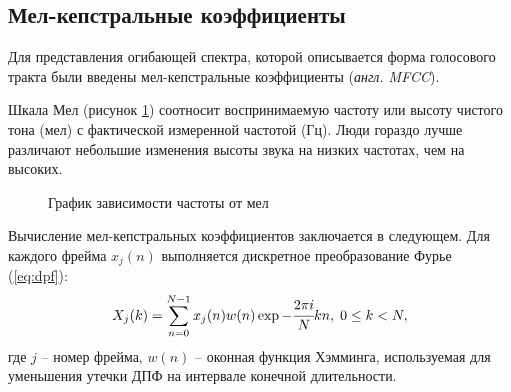 \subsection{Мел-кепстральные коэффициенты}
Для представления огибающей спектра, которой описывается форма голосового тракта были введены мел-кепстральные коэффициенты (\textit{англ. MFCC}).~\cite{mfcc}

Шкала Мел (рисунок \ref{fig:mel-hz}) соотносит воспринимаемую частоту или высоту чистого тона (мел) с фактической измеренной частотой (Гц). Люди гораздо лучше различают небольшие изменения высоты звука на низких частотах, чем на высоких.~\cite{mel} 
\begin{figure}[H]
	\centering
	\caption{График зависимости частоты от мел}
	\label{fig:mel-hz}
\end{figure}

Вычисление мел-кепстральных коэффициентов заключается в следующем. Для каждого фрейма $x_j(n)$ выполняется дискретное преобразование Фурье (\ref{eq:dpf}):
\begin{equation}\label{eq:dpf}
	X_j(k) = \displaystyle\sum_{n = 0}^{N-1} x_j(n)w(n)\exp{-\cfrac{2\pi i}{N}kn},\;0 \leq k < N,
\end{equation}
где $j$ -- номер фрейма, $w(n)$ -- оконная функция Хэмминга, используемая для уменьшения утечки ДПФ на интервале конечной длительности. 

